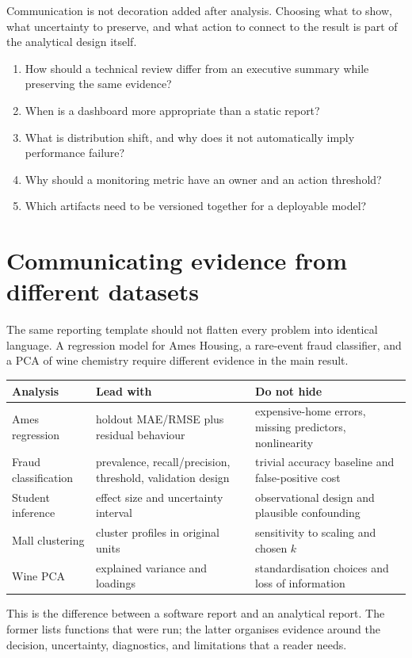 \begin{keyidea}
Communication is not decoration added after analysis. Choosing what to show, what uncertainty to preserve, and what action to connect to the result is part of the analytical design itself.
\end{keyidea}

\begin{quickcheck}
\begin{enumerate}
  \item How should a technical review differ from an executive summary while preserving the same evidence?
  \item When is a dashboard more appropriate than a static report?
  \item What is distribution shift, and why does it not automatically imply performance failure?
  \item Why should a monitoring metric have an owner and an action threshold?
  \item Which artifacts need to be versioned together for a deployable model?
\end{enumerate}
\end{quickcheck}

\section{Communicating evidence from different datasets}

The same reporting template should not flatten every problem into identical language. A regression model for Ames Housing, a rare-event fraud classifier, and a PCA of wine chemistry require different evidence in the main result.

\begin{dstable}
\begin{tabularx}{\linewidth}{@{}D{3.2cm}D{4.4cm}Y@{}}
\toprule
{}
\textbf{Analysis} & \textbf{Lead with} & \textbf{Do not hide} \\
\midrule
Ames regression & holdout MAE/RMSE plus residual behaviour & expensive-home errors, missing predictors, nonlinearity \\
Fraud classification & prevalence, recall/precision, threshold, validation design & trivial accuracy baseline and false-positive cost \\
Student inference & effect size and uncertainty interval & observational design and plausible confounding \\
Mall clustering & cluster profiles in original units & sensitivity to scaling and chosen $k$ \\
Wine PCA & explained variance and loadings & standardisation choices and loss of information \\
\bottomrule
\end{tabularx}
\end{dstable}

This is the difference between a software report and an analytical report. The former lists functions that were run; the latter organises evidence around the decision, uncertainty, diagnostics, and limitations that a reader needs.

